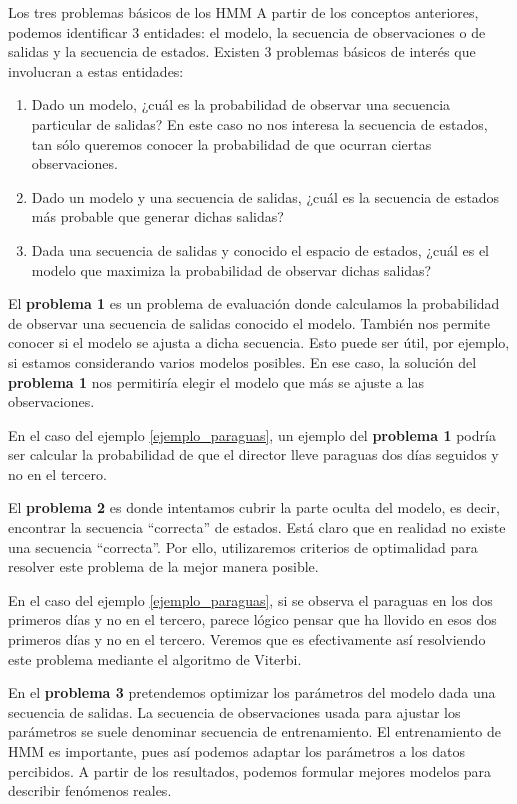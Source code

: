\begin{section}{Los tres problemas básicos de los HMM}
A partir de los conceptos anteriores, podemos identificar 3 entidades: el modelo, la secuencia de observaciones o de salidas y la secuencia de estados. Existen 3 problemas básicos de interés que involucran a estas entidades:
\begin{enumerate}
\item Dado un modelo, ¿cuál es la probabilidad de observar una secuencia particular de salidas? En este caso no nos interesa la secuencia de estados, tan sólo queremos conocer la probabilidad de que ocurran ciertas observaciones.
\item Dado un modelo y una secuencia de salidas, ¿cuál es la secuencia de estados más probable que generar dichas salidas?
\item Dada una secuencia de salidas y conocido el espacio de estados, ¿cuál es el modelo que maximiza la probabilidad de observar dichas salidas?
\end{enumerate}

El \textbf{problema 1} es un problema de evaluación donde calculamos la probabilidad de observar una secuencia de salidas conocido el modelo. También nos permite conocer si el modelo se ajusta a dicha secuencia. Esto puede ser útil, por ejemplo, si estamos considerando varios modelos posibles. En ese caso, la solución del \textbf{problema 1} nos permitiría elegir el modelo que más se ajuste a las observaciones.

En el caso del ejemplo \ref{ejemplo_paraguas}, un ejemplo del \textbf{problema 1} podría ser calcular la probabilidad de que el director lleve paraguas dos días seguidos y no en el tercero.

El \textbf{problema 2} es donde intentamos cubrir la parte oculta del modelo, es decir, encontrar la secuencia \enquote{correcta} de estados. Está claro que en realidad no existe una secuencia \enquote{correcta}. Por ello, utilizaremos criterios de optimalidad para resolver este problema de la mejor manera posible. 

En el caso del ejemplo \ref{ejemplo_paraguas}, si se observa el paraguas en los dos primeros días y no en el tercero, parece lógico pensar que ha llovido en esos dos primeros días y no en el tercero. Veremos que es efectivamente así resolviendo este problema mediante el algoritmo de Viterbi.

En el \textbf{problema 3} pretendemos optimizar los parámetros del modelo dada una secuencia de salidas. La secuencia de observaciones usada para ajustar los parámetros se suele denominar secuencia de entrenamiento. El entrenamiento de HMM es importante, pues así podemos adaptar los parámetros a los datos percibidos. A partir de los resultados, podemos formular mejores modelos para describir fenómenos reales.


\end{section}
